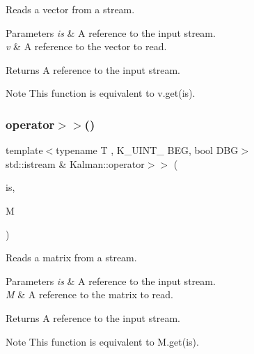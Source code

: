 Reads a vector from a stream. 


\begin{DoxyParams}{Parameters}
{\em is} & A reference to the input stream. \\
\hline
{\em v} & A reference to the vector to read. \\
\hline
\end{DoxyParams}
\begin{DoxyReturn}{Returns}
A reference to the input stream. 
\end{DoxyReturn}
\begin{DoxyNote}{Note}
This function is equivalent to {\ttfamily v.\+get(is)}. 
\end{DoxyNote}
\mbox{\label{namespaceKalman_a72ce00e837fa126ab3961f879e3d8b87}} 
\subsubsection{\texorpdfstring{operator$>$$>$()}{operator>>()}\hspace{0.1cm}{\footnotesize\ttfamily [2/2]}}
{\footnotesize\ttfamily template$<$typename T , K\+\_\+\+U\+I\+N\+T\+\_ B\+EG, bool D\+BG$>$ \\
std\+::istream \& Kalman\+::operator$>$$>$ (\begin{DoxyParamCaption}\item[{std\+::istream \&}]{is,  }\item[{\mbox{\hyperlink{classKalman_1_1KMatrix}{K\+Matrix}}$<$ T, B\+EG, D\+BG $>$ \&}]{M }\end{DoxyParamCaption})\hspace{0.3cm}{\ttfamily [inline]}}



Reads a matrix from a stream. 


\begin{DoxyParams}{Parameters}
{\em is} & A reference to the input stream. \\
\hline
{\em M} & A reference to the matrix to read. \\
\hline
\end{DoxyParams}
\begin{DoxyReturn}{Returns}
A reference to the input stream. 
\end{DoxyReturn}
\begin{DoxyNote}{Note}
This function is equivalent to {\ttfamily M.\+get(is)}. 
\end{DoxyNote}


